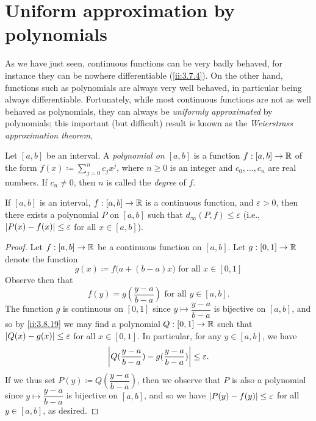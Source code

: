 \section{Uniform approximation by polynomials}\label{ii:sec:3.8}

\begin{note}
  As we have just seen, continuous functions can be very badly behaved, for instance they can be nowhere differentiable (\cref{ii:3.7.4}).
  On the other hand, functions such as polynomials are always very well behaved, in particular being always differentiable.
  Fortunately, while most continuous functions are not as well behaved as polynomials, they can always be \emph{uniformly approximated} by polynomials; this important (but difficult) result is known as the \emph{Weierstrass approximation theorem},
\end{note}

\begin{defn}\label{ii:3.8.1}
  Let \([a, b]\) be an interval.
  A \emph{polynomial on \([a, b]\)} is a
  function \(f : [a, b] \to \mathbb{R}\) of the form \(f(x) \coloneqq \sum_{j = 0}^n c_j x^j\), where \(n \geq 0\) is an integer and \(c_0, \dots, c_n\) are real numbers.
  If \(c_n \neq 0\), then \(n\) is called the \emph{degree} of \(f\).
\end{defn}

\setcounter{thm}{2}
\begin{thm}\label{ii:3.8.3}
  If \([a, b]\) is an interval, \(f : [a, b] \to \mathbb{R}\) is a continuous function, and \(\varepsilon > 0\), then there exists a polynomial \(P\) on \([a, b]\) such that \(d_\infty(P, f) \leq \varepsilon\)
  (i.e., \(\left\lvert P(x) - f(x)\right\rvert \leq \varepsilon\) for all \(x \in [a, b]\)).
\end{thm}

\begin{proof}
  Let \(f : [a, b] \to \mathbb{R}\) be a continuous function on \([a, b]\).
  Let \(g : [0, 1] \to \mathbb{R}\) denote the function
  \[
    g(x) \coloneqq f\big(a + (b - a) x\big) \text{ for all } x \in [0, 1]
  \]
  Observe then that
  \[
    f(y) = g(\dfrac{y - a}{b - a}) \text{ for all } y \in [a, b].
  \]
  The function \(g\) is continuous on \([0, 1]\) since \(y \mapsto \dfrac{y - a}{b - a}\) is bijective on \([a, b]\), and so by \cref{ii:3.8.19} we may find a polynomial \(Q : [0, 1] \to \mathbb{R}\) such that \(\left\lvert Q(x) - g(x)\right\rvert \leq \varepsilon\) for all \(x \in [0, 1]\).
  In particular, for any \(y \in [a, b]\), we have
  \[
    \left\lvert Q(\dfrac{y - a}{b - a}) - g(\dfrac{y - a}{b - a})\right\rvert \leq \varepsilon.
  \]
  If we thus set \(P(y) \coloneqq Q(\dfrac{y - a}{b - a})\), then we observe that \(P\) is also a polynomial since \(y \mapsto \dfrac{y - a}{b - a}\) is bijective on \([a, b]\), and so we have \(\left\lvert P(y) - f(y)\right\rvert \leq \varepsilon\) for all \(y \in [a, b]\), as desired.
\end{proof}

